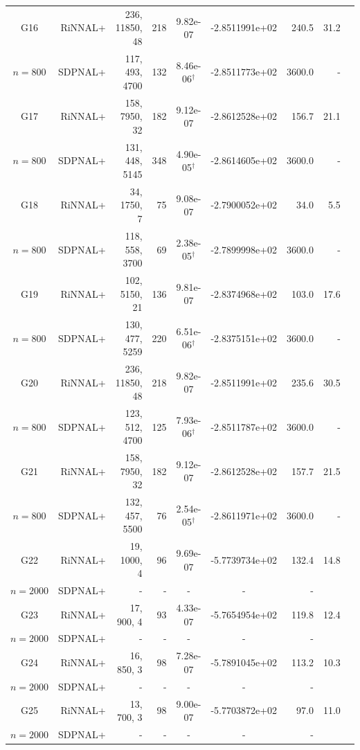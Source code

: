 \documentclass[11pt]{article}
\theoremstyle{plain}
\begin{document}
\begin{footnotesize}
\begin{longtable}[c]{crrrccrrr}
G16& RiNNAL+ & 236, 11850, 48 & 218 & 9.82e-07 & -2.8511991e+02 & 240.5 &31.2 \\ 
$n=800$ & SDPNAL+ & 117, 493, 4700 & 132& 8.46e-06$^{\dagger}$ & -2.8511773e+02 & 3600.0 & - \\ [3pt] 

G17& RiNNAL+ & 158, 7950, 32 & 182 & 9.12e-07 & -2.8612528e+02 & 156.7 &21.1 \\ 
$n=800$ & SDPNAL+ & 131, 448, 5145 & 348& 4.90e-05$^{\dagger}$ & -2.8614605e+02 & 3600.0 & - \\ [3pt] 

G18& RiNNAL+ & 34, 1750, 7 & 75 & 9.08e-07 & -2.7900052e+02 & 34.0 &5.5 \\ 
$n=800$ & SDPNAL+ & 118, 558, 3700 & 69& 2.38e-05$^{\dagger}$ & -2.7899998e+02 & 3600.0 & - \\ [3pt] 

G19& RiNNAL+ & 102, 5150, 21 & 136 & 9.81e-07 & -2.8374968e+02 & 103.0 &17.6 \\ 
$n=800$ & SDPNAL+ & 130, 477, 5259 & 220& 6.51e-06$^{\dagger}$ & -2.8375151e+02 & 3600.0 & - \\ [3pt] 

G20& RiNNAL+ & 236, 11850, 48 & 218 & 9.82e-07 & -2.8511991e+02 & 235.6 &30.5 \\ 
$n=800$ & SDPNAL+ & 123, 512, 4700 & 125& 7.93e-06$^{\dagger}$ & -2.8511787e+02 & 3600.0 & - \\ [3pt] 

G21& RiNNAL+ & 158, 7950, 32 & 182 & 9.12e-07 & -2.8612528e+02 & 157.7 &21.5 \\ 
$n=800$ & SDPNAL+ & 132, 457, 5500 & 76& 2.54e-05$^{\dagger}$ & -2.8611971e+02 & 3600.0 & - \\ [3pt] 

G22& RiNNAL+ & 19, 1000, 4 & 96 & 9.69e-07 & -5.7739734e+02 & 132.4 &14.8 \\ 
$n=2000$ & SDPNAL+ & - & - & - & - & - \\ [3pt] 

G23& RiNNAL+ & 17, 900, 4 & 93 & 4.33e-07 & -5.7654954e+02 & 119.8 &12.4 \\ 
$n=2000$ & SDPNAL+ & - & - & - & - & - \\ [3pt] 

G24& RiNNAL+ & 16, 850, 3 & 98 & 7.28e-07 & -5.7891045e+02 & 113.2 &10.3 \\ 
$n=2000$ & SDPNAL+ & - & - & - & - & - \\ [3pt] 

G25& RiNNAL+ & 13, 700, 3 & 98 & 9.00e-07 & -5.7703872e+02 & 97.0 &11.0 \\ 
$n=2000$ & SDPNAL+ & - & - & - & - & - \\ [3pt] 


\end{longtable}
\end{footnotesize}
\end{document}

